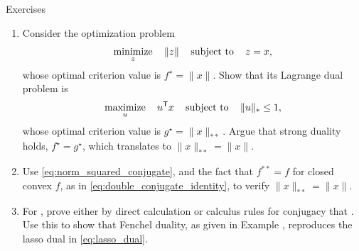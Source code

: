 \begin{xcb}{Exercises}
\begin{enumerate}[label=\thechapter.\arabic*]
\begin{enumerate}[label=\alph*.] 
\item Prove that $\|x\| = \|y\|_*$, for $y \in d(x)$.
\item Prove that $x^\T y = \|x\|^2$, for $y \in d(x)$. 
\item For $f(x) = \frac{1}{2} \|x\|^2$, prove that $\partial f(x) = d(x)$. 
\item For $f^*(y) = \sup_x \, \{ y^\T x - f(x) \}$, prove that the supremum
  defining $f^*(y)$ is achieved for $y \in d(x)$. Plug this in, and use parts a
  and b, to verify \eqref{eq:norm_squared_conjugate}. 
\item Prove that $d(x) = \argmax_y \, \{ x^\T y - \frac{1}{2} \|y\|_*^2 \}$, and 
  $d^*(y) = \argmax_x \, \{ y^\T x - \frac{1}{2} \|x\|^2 \}$. 
\item Prove that $y \in d(x) \iff x \in d^*(y)$.
\end{enumerate}

\item \label{ex:dual_norm_dual2}
  Consider the optimization problem 
  \[
  \operatorname*{minimize}_z \quad \|z\| \quad \operatorname{subject\,\,to} \quad z = x,
  \]
  whose optimal criterion value is $f^\star = \|x\|$. Show that its Lagrange 
  dual problem is 
  \[
  \operatorname*{maximize}_u \quad u^{\mathsf{T}} x \quad \operatorname{subject\,\,to} \quad \|u\|_* \leq 1,
  \]
  whose optimal criterion value is $g^\star = \|x\|_{**}$. Argue that strong 
  duality holds, $f^\star = g^\star$, which translates to $\|x\|_{**} = \|x\|$. 

\item \label{ex:dual_norm_dual3}
  Use \eqref{eq:norm_squared_conjugate}, and the fact that $f^{**} = f$ for
  closed convex $f$, as in \eqref{eq:double_conjugate_identity}, to verify
  $\|x\|_{**} = \|x\|$.  

\item \label{ex:lasso_fenchel_dual}
  For , prove either by direct
  calculation or calculus rules for conjugacy that . Use this to show that Fenchel
  duality, as given in Example , reproduces the lasso 
  dual in \eqref{eq:lasso_dual}.


\end{enumerate}
\end{xcb}
